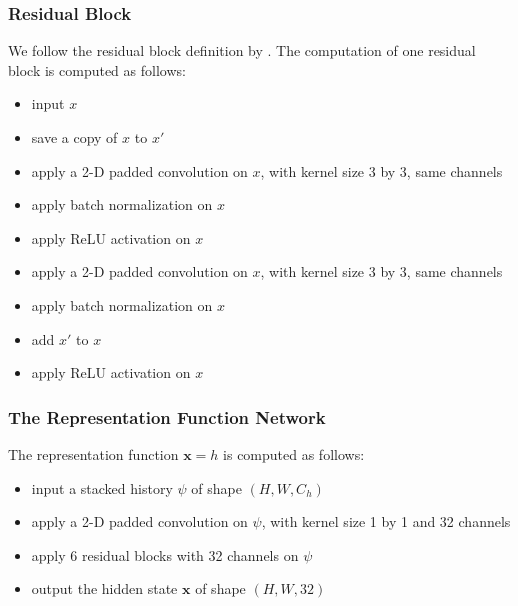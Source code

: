 \subsubsection{Residual Block}
We follow the residual block definition by \citeauthor{DeepResidualLearning_He.Zhang.ea_2016} \cite{DeepResidualLearning_He.Zhang.ea_2016}.
The computation of one residual block is computed as follows:
\begin{itemize}
    \item input $x$
    \item save a copy of $x$ to $x'$
    \item apply a 2-D padded convolution on $x$, with kernel size 3 by 3, same channels
    \item apply batch normalization on $x$
    \item apply ReLU activation on $x$
    \item apply a 2-D padded convolution on $x$, with kernel size 3 by 3, same channels
    \item apply batch normalization on $x$
    \item add $x'$ to $x$
    \item apply ReLU activation on $x$
\end{itemize}

\subsubsection{The Representation Function Network}
The representation function $\mathbf{x} = h$ is computed as follows:
\begin{itemize}
    \item input a stacked history $\psi$ of shape $(H, W, C_h)$
    \item apply a 2-D padded convolution on $\psi$, with kernel size 1 by 1 and 32 channels
    \item apply 6 residual blocks with 32 channels on $\psi$
    \item output the hidden state $\mathbf{x}$ of shape $(H, W, 32)$
\end{itemize}

